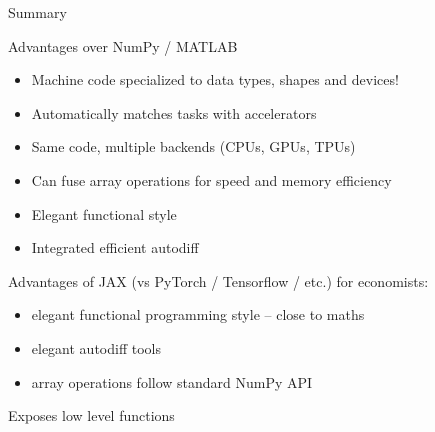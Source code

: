 \begin{frame}{Summary}
    
    Advantages over NumPy / MATLAB

    \vspace{0.5em}
    \begin{itemize}
        \item Machine code specialized to data types, shapes and devices!
        \vspace{0.5em}
        \vspace{0.5em}
        \item Automatically matches tasks with accelerators
        \vspace{0.5em}
        \vspace{0.5em}
        \item Same code, multiple backends (CPUs, GPUs, TPUs)
        \vspace{0.5em}
        \vspace{0.5em}
        \item Can fuse array operations for speed and memory efficiency
        \vspace{0.5em}
        \vspace{0.5em}
        \item Elegant functional style
        \vspace{0.5em}
        \vspace{0.5em}
        \item Integrated efficient autodiff
    \end{itemize}

\end{frame}

\begin{frame}

    Advantages of JAX (vs PyTorch / Tensorflow / etc.) for economists:
    \begin{itemize}
        \item elegant functional programming style -- close to maths
            \vspace{0.5em}
        \item elegant autodiff tools
            \vspace{0.5em}
        \item array operations follow standard NumPy API
    \end{itemize}

            \vspace{0.5em}
            \vspace{0.5em}

    Exposes low level functions 

\end{frame}



